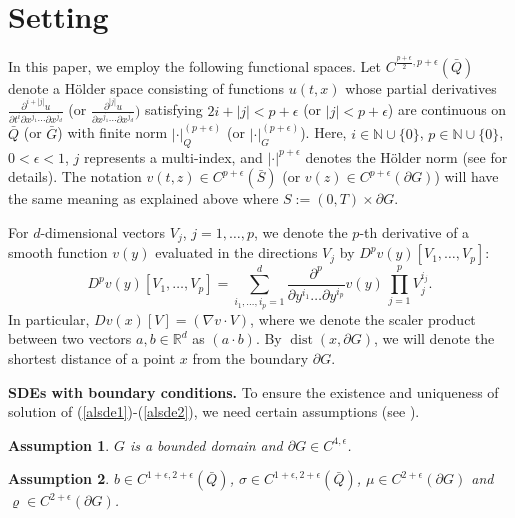 \documentclass{article}
\newtheorem{assumption}{Assumption}[section]
\theoremstyle{definition}
\DeclareMathOperator{\dist}{dist}
\numberwithin{equation}{section}
\begin{document}
\section{Setting}\label{sticky_Sec_2}
In this paper, we employ the following functional spaces. Let $C^{\frac{p+\epsilon}{2},p+\epsilon}(\bar{Q})$  denote a Hölder space consisting of functions $u(t,x)$  whose partial derivatives 
$\frac{\partial^{i+|j|}u}{\partial t^{i} \partial x^{j_{1}}\cdots \partial x^{j_{d}}}$
(or 
$\frac{\partial^{|j|}u}{\partial x^{j_{1}}\cdots \partial x^{j_{d}}})$
satisfying $2i + |j| < p+ \epsilon$ (or $|j| < p+\epsilon$) are continuous on $\bar{Q}$ (or $\bar{G}$) with finite norm $|\cdot|_{Q}^{(p+\epsilon)}$ (or $|\cdot|_{G}^{(p+\epsilon)}$). Here, $i \in \mathbb{N}\cup \{0\}$, $p \in \mathbb{N}\cup \{0\}$, $0 <\epsilon < 1$, $j$ represents a multi-index, and $|\cdot|^{p+\epsilon}$ denotes the Hölder norm (see \cite[pp. 7-8]{3} for details). The notation $v(t,z) \in C^{p + \epsilon}(\bar{S})$ (or $v(z) \in C^{p+\epsilon}(\partial G)$)  will have the same meaning as explained above where $S:= (0,T) \times \partial G$.

 For $d$-dimensional vectors  $V_{j}$, $j =1,\dots,p$, 
we denote the $p$-th derivative of a smooth function $v(y)$ evaluated in
the directions  $V_{j}$ by $D^{p}v(y)[V_{1},\dots,V_{p}]$:
\begin{equation*}\label{notationequation}
  D^{p}v(y)[V_{1},\dots,V_{p}] =  \sum_{i_1,\dots,i_p=1}^{d}\frac{\partial^{p} }{\partial y^{i_{1}}\dots\partial y^{i_{p}}} v(y) \, \prod\limits_{j=1}^{p}V_{j}^{i_{j}}.
\end{equation*}
In particular, $Dv(x)[V] = (\nabla v \cdot V)$, where we denote the scaler product between two vectors $a, b \in \mathbb{R}^d$ as $(a \cdot b)$.
By $\dist(x, \partial G)$, we will denote the shortest distance of a point $x$ from the boundary $\partial G$.


\noindent \textbf{SDEs with boundary conditions.}
 To ensure the existence and uniqueness of solution of (\ref{alsde1})-(\ref{alsde2}), we need certain assumptions (see \cite{w3,w4,w2,w1,graham1988martingale}).
\begin{assumption}\label{boundary_assum} $ G$ is a bounded domain and $\partial G \in C^{4,\epsilon}$. 
\end{assumption}


\begin{assumption}\label{assump_para_coeff}
$b \in C^{1+\epsilon, 2+ \epsilon}(\bar{Q})$, $\sigma \in C^{1+\epsilon, 2+ \epsilon}(\bar{Q})$, $ \mu \in C^{ 2+ \epsilon}(\partial G) $ and  $ \varrho \in C^{ 2+ \epsilon}(\partial G) $.
\end{assumption} 
\end{document}
